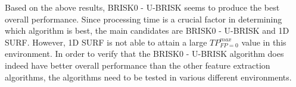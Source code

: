 \documentclass[11pt]{report}
\begin{document}
Based on the above results, BRISK0 - U-BRISK seems to produce the best overall performance. Since processing time is a crucial factor in determining which algorithm is best, the main candidates are BRISK0 - U-BRISK and 1D SURF. However, 1D SURF is not able to attain a large $TP_{FP=0}^{max}$ value in this environment. In order to verify that the BRISK0 - U-BRISK algorithm does indeed have better overall performance than the other feature extraction algorithms, the algorithms need to be tested in various different environments.\\ 


\end{document}
